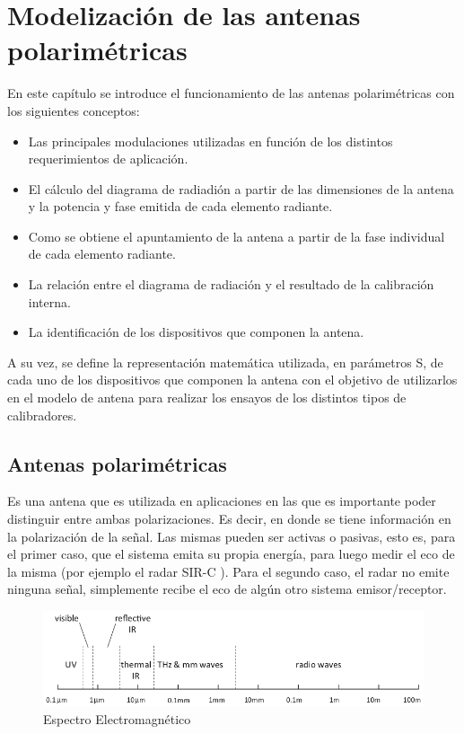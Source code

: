 
\chapter{Modelización de las antenas polarimétricas} %
\label{ch:phasedArray}

En este capítulo se introduce el funcionamiento de las antenas polarimétricas con los siguientes conceptos:
\begin{itemize}
	\item Las principales modulaciones utilizadas en función de los distintos requerimientos de aplicación.
	\item El cálculo del diagrama de radiadión a partir de las dimensiones de la antena y la potencia y fase emitida de cada 
		elemento radiante.
	\item Como se obtiene el apuntamiento de la antena a partir de la fase individual de cada elemento radiante. 
	\item La relación entre el diagrama de radiación y el resultado de la calibración interna. 
	\item La identificación de los dispositivos que componen la antena.
\end{itemize}

A su vez, se define la representación matemática utilizada, en parámetros S, de cada uno de los dispositivos que componen la 
antena con el objetivo de utilizarlos en el modelo de antena para realizar los ensayos de los distintos tipos de calibradores.


\section{Antenas polarimétricas}

Es una antena que es utilizada en aplicaciones en las que es importante poder distinguir entre ambas polarizaciones. Es decir, 
en donde se tiene información en la polarización de la señal. Las mismas pueden ser activas o pasivas, esto es, para el primer
caso, que el sistema emita su propia energía, para luego medir el eco de la misma (por ejemplo el radar SIR-C 
\cite{Curlander1991}). Para el segundo caso, el radar no emite ninguna señal, simplemente recibe el eco de algún otro sistema 
emisor/receptor.

\begin{figure}[H]
 \centering
 \includegraphics[width=12cm]{gfx/electromagneticSpectrum.png}
 \caption{Espectro Electromagnético \cite{Richards2009}}
 \label{fig:spectrum}
\end{figure}

